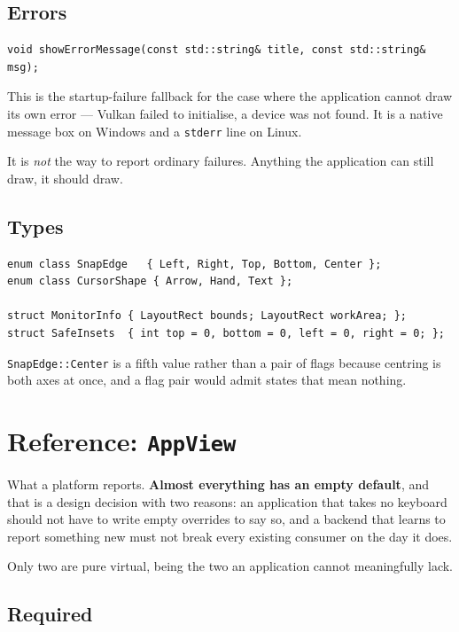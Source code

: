\documentclass[11pt,a4paper]{article}
\begin{document}
\subsection{Errors}

\begin{lstlisting}
void showErrorMessage(const std::string& title, const std::string& msg);
\end{lstlisting}

\noindent This is the startup-failure fallback for the case where the application cannot
draw its own error --- Vulkan failed to initialise, a device was not found. It
is a native message box on Windows and a \texttt{stderr} line on Linux.

It is \emph{not} the way to report ordinary failures. Anything the application
can still draw, it should draw.

\subsection{Types}

\begin{lstlisting}
enum class SnapEdge   { Left, Right, Top, Bottom, Center };
enum class CursorShape { Arrow, Hand, Text };

struct MonitorInfo { LayoutRect bounds; LayoutRect workArea; };
struct SafeInsets  { int top = 0, bottom = 0, left = 0, right = 0; };
\end{lstlisting}

\texttt{SnapEdge::Center} is a fifth value rather than a pair of flags because
centring is both axes at once, and a flag pair would admit states that mean
nothing.

\section{Reference: \texttt{AppView}}

What a platform reports. \textbf{Almost everything has an empty default}, and
that is a design decision with two reasons: an application that takes no
keyboard should not have to write empty overrides to say so, and a backend that
learns to report something new must not break every existing consumer on the day
it does.

Only two are pure virtual, being the two an application cannot meaningfully
lack.

\subsection{Required}
\end{document}
